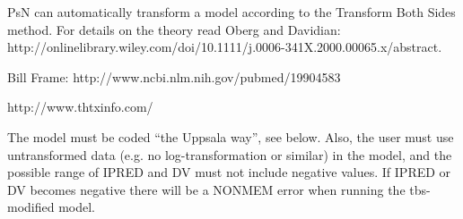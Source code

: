 PsN can automatically transform a model according to the Transform Both Sides method. For details on the theory read Oberg and Davidian:\\
http://onlinelibrary.wiley.com/doi/10.1111/j.0006-341X.2000.00065.x/abstract.

Bill Frame: http://www.ncbi.nlm.nih.gov/pubmed/19904583

http://www.thtxinfo.com/
 
The model must be coded “the Uppsala way”, see below. Also, the user must use untransformed data (e.g. no log-transformation or similar) in the model, and the possible range of IPRED and DV must not include negative values. If IPRED or DV becomes negative there will be a NONMEM error when running the tbs-modified model. 



